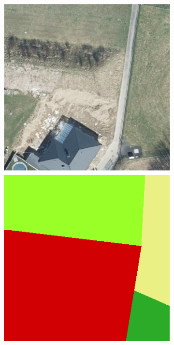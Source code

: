 \begin{figure}[h]
    \centering
    \begin{subfigure}{0.22\textwidth}
        \includegraphics[width=\textwidth]{images/consideration_labels/44883}

\end{subfigure}
\end{figure}

